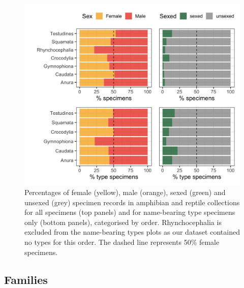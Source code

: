 \documentclass[a4paper, 12pt]{article}
\begin{document}
\begin{figure}[H]
 \centering
  \includegraphics[width = \linewidth]{figures/types-order.png}
  \caption{Percentages of female (yellow), male (orange), sexed (green) and unsexed (grey) specimen records in amphibian and reptile collections for all specimens (top panels) and for name-bearing type specimens only (bottom panels), categorised by order. Rhynchocephalia is excluded from the name-bearing types plots as our dataset contained no types for this order. 
  The dashed line represents 50\% female specimens.}
  \label{fig-types-order}
\end{figure}

\newpage
\subsection{Families}


%

\end{document}
